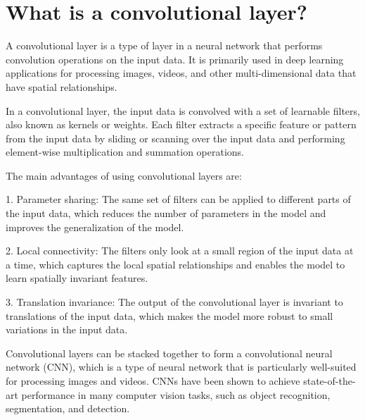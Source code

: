 \section{What is a convolutional layer?}
A convolutional layer is a type of layer in a neural network that performs convolution operations on the input data. It is primarily used in deep learning applications for processing images, videos, and other multi-dimensional data that have spatial relationships.

In a convolutional layer, the input data is convolved with a set of learnable filters, also known as kernels or weights. Each filter extracts a specific feature or pattern from the input data by sliding or scanning over the input data and performing element-wise multiplication and summation operations.

The main advantages of using convolutional layers are:

1. Parameter sharing: The same set of filters can be applied to different parts of the input data, which reduces the number of parameters in the model and improves the generalization of the model.

2. Local connectivity: The filters only look at a small region of the input data at a time, which captures the local spatial relationships and enables the model to learn spatially invariant features.

3. Translation invariance: The output of the convolutional layer is invariant to translations of the input data, which makes the model more robust to small variations in the input data.

Convolutional layers can be stacked together to form a convolutional neural network (CNN), which is a type of neural network that is particularly well-suited for processing images and videos. CNNs have been shown to achieve state-of-the-art performance in many computer vision tasks, such as object recognition, segmentation, and detection.

